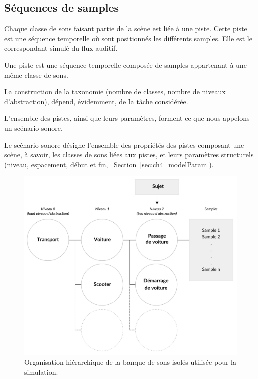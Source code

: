 \subsection{Séquences de samples}
\label{sec:ch4_seqSample}

Chaque classe de sons faisant partie de la scène est liée à une piste. Cette piste est une séquence temporelle où sont positionnés les différents samples. Elle est le correspondant simulé du flux auditif.

\begin{mydef}
Une piste est une séquence temporelle composée de samples appartenant à une même classe de sons.
\end{mydef}

La construction de la taxonomie (nombre de classes, nombre de niveaux d'abstraction), dépend, évidemment, de la tâche considérée. 

L'ensemble des pistes, ainsi que leurs paramètres, forment ce que nous appelons un scénario sonore.

\begin{mydef}
Le scénario sonore désigne l'ensemble des propriétés des pistes composant une scène, à savoir, les classes de sons liées aux pistes, et leurs paramètres structurels (niveau, espacement, début et fin, \cf~Section~\ref{sec:ch4_modelParam}).
\end{mydef}

\begin{figure}[t]
        \myfloatalign
        \includegraphics[width=.8\linewidth]{gfx/ch_4/3}
       \caption{Organisation hiérarchique de la banque de sons isolés utilisée pour la simulation.}\label{fig:orgDb}
\end{figure}

